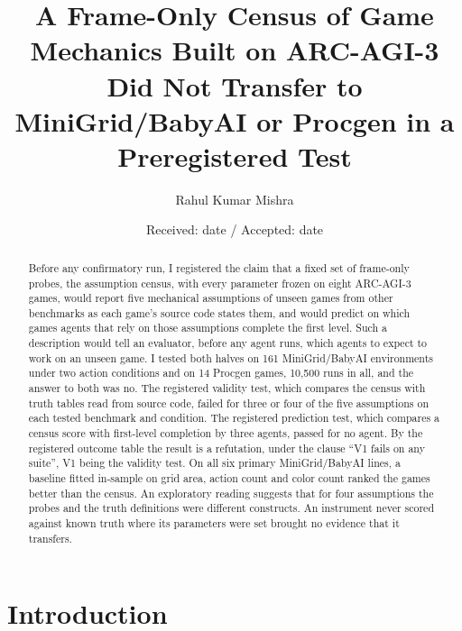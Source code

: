 \documentclass[twocolumn]{svjour3}
\begin{document}
\title{A Frame-Only Census of Game Mechanics Built on ARC-AGI-3 Did Not
Transfer to MiniGrid/BabyAI or Procgen in a Preregistered Test}
\author{Rahul Kumar Mishra}
\date{Received: date / Accepted: date}
\maketitle
\begin{abstract}
Before any confirmatory run, I registered the claim that a fixed set of
frame-only probes, the assumption census, with every parameter frozen on
eight ARC-AGI-3 games, would report five mechanical assumptions of
unseen games from other benchmarks as each game's source code states
them, and would predict on which games agents that rely on those
assumptions complete the first level. Such a description would tell an
evaluator, before any agent runs, which agents to expect to work on an
unseen game. I tested both halves on 161 MiniGrid/BabyAI environments
under two action conditions and on 14 Procgen games, 10,500 runs in all,
and the answer to both was no. The registered validity test, which
compares the census with truth tables read from source code, failed for
three or four of the five assumptions on each tested benchmark and
condition. The registered prediction test, which compares a census score
with first-level completion by three agents, passed for no agent. By the
registered outcome table the result is a refutation, under the clause
``V1 fails on any suite'', V1 being the validity test. On all six
primary MiniGrid/BabyAI lines, a baseline fitted in-sample on grid area,
action count and color count ranked the games better than the census. An
exploratory reading suggests that for four assumptions the probes and
the truth definitions were different constructs. An instrument never
scored against known truth where its parameters were set brought no
evidence that it transfers.
\end{abstract}

\section{Introduction}\label{sec:intro}
\end{document}
